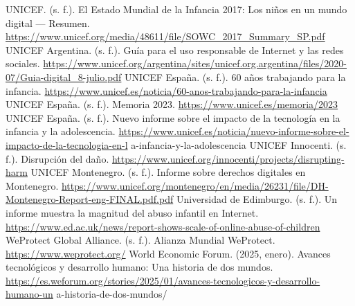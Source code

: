 \begin{referencelist}
   UNICEF. (s. f.). El Estado Mundial de la Infancia 2017: Los niños en un mundo digital — Resumen. \url{https://www.unicef.org/media/48611/file/SOWC_2017_Summary_SP.pdf}
   UNICEF Argentina. (s. f.). Guía para el uso responsable de Internet y las redes sociales. \url{https://www.unicef.org/argentina/sites/unicef.org.argentina/files/2020-07/Guia-digital_8-julio.pdf}
   UNICEF España. (s. f.). 60 años trabajando para la infancia. \url{https://www.unicef.es/noticia/60-anos-trabajando-para-la-infancia}
   UNICEF España. (s. f.). Memoria 2023. \url{https://www.unicef.es/memoria/2023}
   UNICEF España. (s. f.). Nuevo informe sobre el impacto de la tecnología en la infancia y la adolescencia. \url{https://www.unicef.es/noticia/nuevo-informe-sobre-el-impacto-de-la-tecnologia-en-l} a-infancia-y-la-adolescencia
   UNICEF Innocenti. (s. f.). Disrupción del daño. \url{https://www.unicef.org/innocenti/projects/disrupting-harm}
   UNICEF Montenegro. (s. f.). Informe sobre derechos digitales en Montenegro. \url{https://www.unicef.org/montenegro/en/media/26231/file/DH-Montenegro-Report-eng-FINAL.pdf.pdf}
   Universidad de Edimburgo. (s. f.). Un informe muestra la magnitud del abuso infantil en Internet. \url{https://www.ed.ac.uk/news/report-shows-scale-of-online-abuse-of-children}
   WeProtect Global Alliance. (s. f.). Alianza Mundial WeProtect. \url{https://www.weprotect.org/}
   World Economic Forum. (2025, enero). Avances tecnológicos y desarrollo humano: Una historia de dos mundos. \url{https://es.weforum.org/stories/2025/01/avances-tecnologicos-y-desarrollo-humano-un} a-historia-de-dos-mundos/
\end{referencelist}
